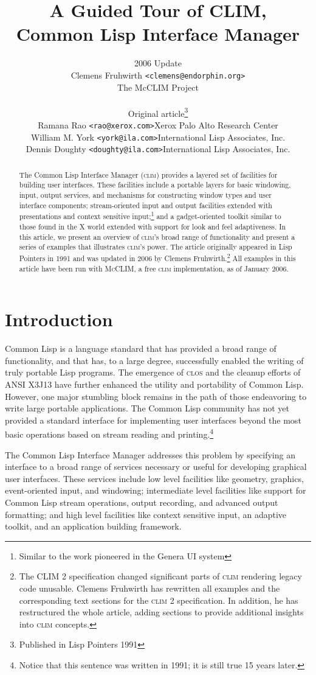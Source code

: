 \documentclass[twocolumn,a4paper]{article}
\title{\Huge A Guided Tour of CLIM, \\ Common Lisp Interface Manager}
\author{
2006 Update \\ 
Clemens Fruhwirth \texttt{<clemens@endorphin.org>} \\ The McCLIM Project 
\bigskip \\
\begin{tabular}{ll}
\multicolumn{2}{c}{Original article\footnote{Published in Lisp Pointers 1991}} \\ 
Ramana Rao \texttt{<rao@xerox.com>} &  Xerox Palo Alto Research Center \\
William M. York \texttt{<york@ila.com>} & International Lisp Associates, Inc. \\
Dennis Doughty \texttt{<doughty@ila.com>} &  International Lisp Associates, Inc. 
\end{tabular}
}
\newcommand {\CLIM}{\textsc{clim}}
\newcommand {\CLOS}{\textsc{clos}}
\newcommand {\mcclim}{\textsc{McCLIM}}
\begin{document}
\maketitle
\begin{abstract}
\noindent The Common Lisp Interface Manager (\CLIM{}) provides a
layered set of facilities for building user interfaces. These
facilities include a portable layers for basic windowing, input,
output services, and mechanisms for constructing window types and user
interface components; stream-oriented input and output facilities
extended with presentations and context sensitive
input;\footnote{Similar to the work pioneered in the Genera UI system}
and a gadget-oriented toolkit similar to those found in the X world
extended with support for look and feel adaptiveness. In this article,
we present an overview of \CLIM{}'s broad range of functionality and
present a series of examples that illustrates \CLIM{}'s power. The
article originally appeared in Lisp Pointers in 1991 and was updated
in 2006 by Clemens Fruhwirth.\footnote{The CLIM 2 specification
  changed significant parts of \CLIM{} rendering legacy code
  unusable. Clemens Fruhwirth has rewritten all examples and the 
  corresponding text sections for the \CLIM{} 2 specification. In
  addition, he has restructured the whole article, adding sections
  to provide additional insights into \CLIM{} concepts.} All examples
in this article have been run with \mcclim{}\cite{mcclim}, a free
\CLIM{} implementation, as of January 2006.
\end{abstract}

\section*{Introduction}
Common Lisp is a language standard that has provided a broad range of
functionality, and that has, to a large degree, successfully enabled
the writing of truly portable Lisp programs. The emergence of \CLOS{} and
the cleanup efforts of ANSI X3J13 have further enhanced the utility
and portability of Common Lisp. However, one major stumbling block
remains in the path of those endeavoring to write large portable
applications. The Common Lisp community has not yet provided a
standard interface for implementing user interfaces beyond the most
basic operations based on stream reading and printing.\footnote{Notice
  that this sentence was written in 1991; it is still
  true 15 years later.}

The Common Lisp Interface Manager addresses this problem by specifying
an interface to a broad range of services necessary or useful for
developing graphical user interfaces. These services include low level
facilities like geometry, graphics, event-oriented input, and
windowing; intermediate level facilities like support for Common Lisp
stream operations, output recording, and advanced output formatting;
and high level facilities like context sensitive input, an adaptive
toolkit, and an application building framework.
\end{document}
